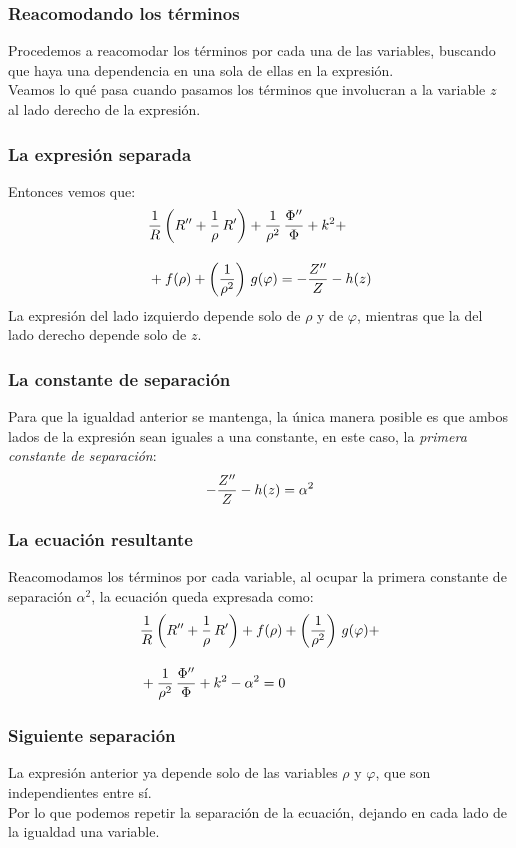 \documentclass[12pt]{beamer}
\begin{document}
\begin{frame}
\frametitle{Reacomodando los términos}
Procedemos a reacomodar los términos por cada una de las variables, buscando que haya una dependencia en una sola de ellas en la expresión.
\\
\bigskip
\pause
Veamos lo qué pasa cuando pasamos los términos que involucran a la variable $z$ al lado derecho de la expresión.
\end{frame}
\begin{frame}
\frametitle{La expresión separada}
Entonces vemos que:
\pause
\begin{align*}
&{} \dfrac{1}{R} \left( {R}^{\prime \prime} + \dfrac{1}{\rho} \, {R}^{\prime} \right) + \dfrac{1}{\rho^{2}} \, \dfrac{{\Phi}^{\prime \prime}}{\Phi} + k^{2} + \\[1em]
&+ f(\rho) + \left( \dfrac{1}{\rho^{2}} \right) \, g(\varphi) = - \dfrac{{Z}^{\prime \prime}}{Z} - h(z)
\end{align*}
\pause
La expresión del lado izquierdo depende solo de $\rho$ y de $\varphi$, mientras que la del lado derecho depende solo de $z$.
\end{frame}
\begin{frame}
\frametitle{La constante de separación}
Para que la igualdad anterior se mantenga, la única manera posible es que ambos lados de la expresión sean iguales a una constante, en este caso, la \emph{primera constante de separación}:
\pause
\begin{align*}
- \dfrac{{Z}^{\prime \prime}}{Z} - h(z) = \alpha^{2}
\end{align*}
\end{frame}
\begin{frame}
\frametitle{La ecuación resultante}
Reacomodamos los términos por cada variable, al ocupar la primera constante de separación $\alpha^{2}$, la ecuación queda expresada como:
\pause
\begin{align*}
&{} \dfrac{1}{R} \left( {R}^{\prime \prime} + \dfrac{1}{\rho} \, {R}^{\prime} \right) +  f(\rho) + \left( \dfrac{1}{\rho^{2}} \right) \, g(\varphi) + \\[1em]
&+ \dfrac{1}{\rho^{2}} \, \dfrac{{\Phi}^{\prime \prime}}{\Phi} + k^{2} - \alpha^{2} = 0
\end{align*}
\end{frame}
\begin{frame}
\frametitle{Siguiente separación}
La expresión anterior ya depende solo de las variables $\rho$ y $\varphi$, que son independientes entre sí.
\\
\bigskip
\pause
Por lo que podemos repetir la separación de la ecuación, dejando en cada lado de la igualdad una variable.
\end{frame}
\end{document}
